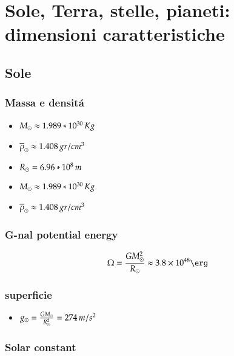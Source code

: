 \documentclass[main.tex]{subfiles}
\begin{document}
\chapter{Sole, Terra, stelle, pianeti: dimensioni caratteristiche}
\PartialToc

\section{Sole}

\subsection{Massa e densit\'a}
\begin{itemize}
\item $M_{\odot}\approx1.989*10^{30}\,Kg$
\item $\overline{\rho}_{\odot}\approx1.408 \, gr/cm^3$
\end{itemize}

\begin{itemize}
\item $R_{\odot}=6.96*10^8\,m$
\end{itemize}
\begin{itemize}
\item $M_{\odot}\approx1.989*10^{30}\,Kg$
\item $\overline{\rho}_{\odot}\approx1.408 \, gr/cm^3$
\end{itemize}

\subsection{G-nal potential energy}

\begin{equation*}
\Omega=\frac{G\msun^2}{\rsun}\approx\num{3.8e48}\si{\erg}
\end{equation*}

\subsection{superficie}

\begin{itemize}
\item $g_{\odot}=\frac{GM_{\odot}}{R_{\odot}^2}=274\,m/s^2$
\end{itemize} 

\subsection{Solar constant}
\end{document}
